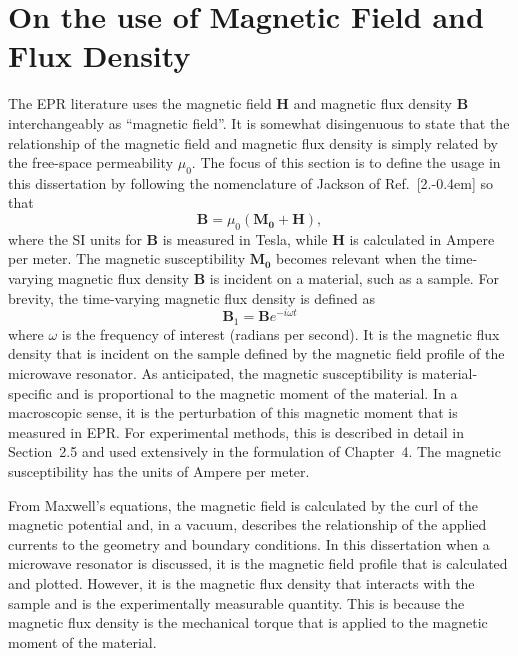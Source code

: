 \section{On the use of Magnetic Field and Flux Density}
The EPR literature uses the magnetic field $\mathbf{H}$ and magnetic flux density $\mathbf{B}$ interchangeably as ``magnetic field''. It is somewhat disingenuous to state that the relationship of the magnetic field and magnetic flux density is simply related by the free-space permeability $\mu_0$. The focus of this section is to define the usage in this dissertation by following the nomenclature of Jackson of Ref.~[2.\kern-0.4em] so that 
\begin{equation}
    \mathbf{B} = \mu_0(\mathbf{M_0} + \mathbf{H}),
\end{equation}
where the SI units for $\mathbf{B}$ is measured in Tesla, while $\mathbf{H}$ is calculated in Ampere per meter. The magnetic susceptibility $\mathbf{M_0}$ becomes relevant when the time-varying magnetic flux density $\mathbf{B}$ is incident on a material, such as a sample. For brevity, the time-varying magnetic flux density is defined as
\begin{equation}
    \mathbf{B}_1 = \mathbf{B} e^{-i\omega t}
\end{equation}
where $\omega$ is the frequency of interest (radians per second). It is the magnetic flux density that is incident on the sample defined by the magnetic field profile of the microwave resonator. As anticipated, the magnetic susceptibility is material-specific and is proportional to the magnetic moment of the material. In a macroscopic sense, it is the perturbation of this magnetic moment that is measured in EPR. For experimental methods, this is described in detail in Section~2.5 and used extensively in the formulation of Chapter~4. The magnetic susceptibility has the units of Ampere per meter.

From Maxwell's equations, the magnetic field is calculated by the curl of the magnetic potential and, in a vacuum, describes the relationship of the applied currents to the geometry and boundary conditions. \cite{jackson1975classical} In this dissertation when a microwave resonator is discussed, it is the magnetic field profile that is calculated and plotted. However, it is the magnetic flux density that interacts with the sample and is the experimentally measurable quantity. This is because the magnetic flux density is the mechanical torque that is applied to the magnetic moment of the material. 

